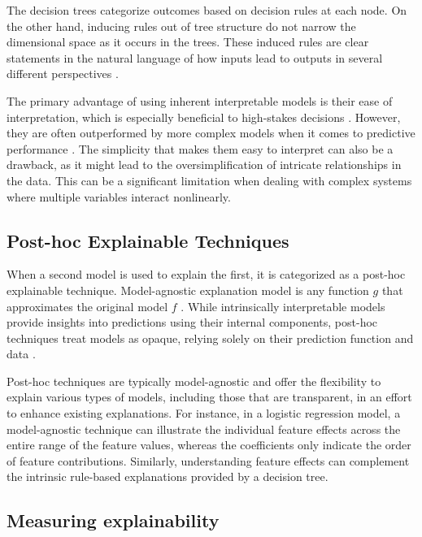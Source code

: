 The decision trees categorize outcomes based on decision rules at each node. On the other hand, inducing rules out of tree structure do not narrow the dimensional space as it occurs in the trees. These induced rules are clear statements in the natural language of how inputs lead to outputs in several different perspectives \cite{SilvaFilho2019DataInstitutes}.

The primary advantage of using inherent interpretable models is their ease of interpretation, which is especially beneficial to high-stakes decisions \cite{Rudin2019StopInstead}. However, they are often outperformed by more complex models when it comes to predictive performance \cite{Loyola-Gonzalez2019Black-boxView}. The simplicity that makes them easy to interpret can also be a drawback, as it might lead to the oversimplification of intricate relationships in the data. This can be a significant limitation when dealing with complex systems where multiple variables interact nonlinearly.

\subsection{Post-hoc Explainable Techniques}

When a second model is used to explain the first, it is categorized as a post-hoc explainable technique. Model-agnostic explanation model is any function \(g\) that approximates the original model \(f\) \cite{10.5555/3295222.3295230}. While intrinsically interpretable models provide insights into predictions using their internal components, post-hoc techniques treat models as opaque, relying solely on their prediction function and data \cite{Molnar2022Model-agnosticLearning}. 

Post-hoc techniques are typically model-agnostic and offer the flexibility to explain various types of models, including those that are transparent, in an effort to enhance existing explanations. For instance, in a logistic regression model, a model-agnostic technique can illustrate the individual feature effects across the entire range of the feature values, whereas the coefficients only indicate the order of feature contributions. Similarly, understanding feature effects can complement the intrinsic rule-based explanations provided by a decision tree. 

\subsection{Measuring explainability}

